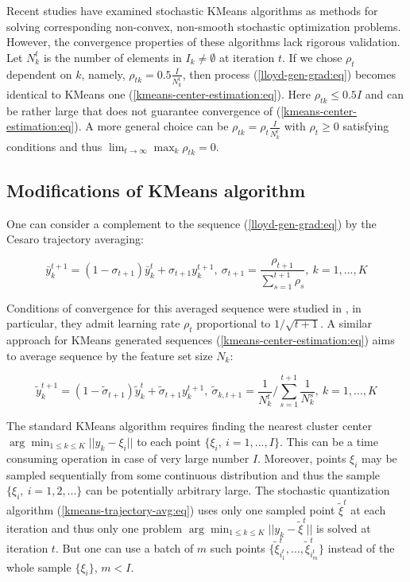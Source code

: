 Recent studies \cite{Tang_2017,Zhao_Lan_Chen_Ngo_2021} have examined stochastic KMeans algorithms as methods for solving corresponding non-convex, non-smooth stochastic optimization problems. However, the convergence properties of these algorithms lack rigorous validation. Let $ N_k^t $ is the number of elements in $ I_k \neq \emptyset $ at iteration $ t $. If we chose $ \rho_t $ dependent on $ k $, namely, $ \rho_{tk} = 0.5 \frac{I}{N_k^t} $, then process (\ref{lloyd-gen-grad:eq}) becomes identical to KMeans one (\ref{kmeans-center-estimation:eq}). Here $ \rho_{tk} \leq 0.5 I $ and can be rather large that does not guarantee convergence of (\ref{kmeans-center-estimation:eq}). A more general choice can be $ \rho_{tk} = \rho_t \frac{I}{N_k^t} $ with $ \rho_t \geq 0 $ satisfying conditions  and thus $ \lim_{t \to \infty} \max_k \rho_{tk} = 0 $.

\subsection{Modifications of KMeans algorithm}

One can consider a complement to the sequence (\ref{lloyd-gen-grad:eq}) by the Cesaro trajectory averaging:

\begin{equation}
    \label{kmeans-trajectory-avg:eq}
        \bar{y}_k^{t+1} = (1 - \sigma_{t+1}) \bar{y}_k^{t} + \sigma_{t+1} y_k^{t+1}, \> \sigma_{t+1} = \frac{\rho_{t+1}}{\sum_{s=1}^{t+1} \rho_{s}}, \> k = 1, ..., K
\end{equation}

Conditions of convergence for this averaged sequence were studied in \cite{mikhalevich2024}, in particular, they admit learning rate $ \rho_t $ proportional to $ 1 / \sqrt{t+1} $. A similar approach for KMeans generated sequences (\ref{kmeans-center-estimation:eq}) aims to average sequence by the feature set size $ N_k $:

\begin{equation}
    \label{kmeans-trajectory-avg-alt:eq}
        \tilde{y}_k^{t+1} = (1 - \tilde{\sigma}_{t+1}) \tilde{y}_k^{t} + \tilde{\sigma}_{t+1} y_k^{t+1}, \> \tilde{\sigma}_{k, t+1} = \frac{1}{N_k^t} / \sum_{s=1}^{t+1} \frac{1}{N_k^s}, \> k = 1, ..., K
\end{equation}

The standard KMeans algorithm requires finding the nearest cluster center $ \arg \min_{1 \leq k \leq K} || y_k - \xi_i || $ to each point $ \{ \xi_i, \> i = 1, ..., I \} $. This can be a time consuming operation in case of very large number $ I $. Moreover, points $ \xi_i $ may be sampled sequentially from some continuous distribution and thus the sample $ \{ \xi_i, \> i = 1, 2, ... \} $ can be potentially arbitrary large. The stochastic quantization algorithm (\ref{kmeans-trajectory-avg:eq}) uses only one sampled point $ \tilde{\xi}^t $ at each iteration and thus only one problem $ \arg \min_{1 \leq k \leq K} || y_k - \tilde{\xi}^t || $ is solved at iteration $ t $. But one can use a batch of $ m $ such points $ \{ \tilde{\xi}^t_{i_1^t}, ..., \tilde{\xi}^t_{i_m^t} \} $ instead of the whole sample $ \{ \xi_i \} $, $ m < I $. 
